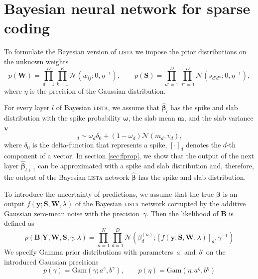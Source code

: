 \documentclass{article}
\begin{document}
\section{Bayesian neural network for sparse coding}
\label{sec:bayesian_lista}
To formulate the Bayesian version of \textsc{lista} we impose the prior distributions on the unknown weights
\begin{equation}
\label{eq:ws}
p(\mathbf{W}) = \prod_{d=1}^D\prod_{k=1}^K \mathcal{N}(w_{ij} ; 0, \eta^{-1}), \qquad
p(\mathbf{S}) = \prod_{d'=1}^D\prod_{d''=1}^D \mathcal{N}(s_{d'd''} ; 0, \eta^{-1}),
\end{equation}
where $\eta$ is the precision of the Gaussian distribution.

For every layer $l$ of Bayesian \textsc{lista}, we assume that $\widehat{\boldsymbol\beta}_{l}$ has the spike and slab distribution with the spike probability $\boldsymbol\omega$, the slab mean $\mathbf{m}$, and the slab variance $\mathbf{v}$
\begin{equation}
[\widehat{\boldsymbol\beta}_{l}]_d \sim \omega_d \delta_0 + (1 - \omega_d)\mathcal{N}(m_d, v_d),
\end{equation}
where $\delta_0$ is the delta-function that represents a spike, $[\cdot]_d$ denotes the $d$-th component of a vector. In section \ref{sec:fprop}, we show that the output of the next layer $\widehat{\boldsymbol\beta}_{l+1}$ can be approximated with a spike and slab distribution and, therefore, the output of the Bayesian \textsc{lista} network $\widehat{\boldsymbol\beta}$ has the spike and slab distribution.

To introduce the uncertainty of predictions, we assume that the true $\boldsymbol\beta$ is an output $f(\mathbf{y} ; \mathbf{S}, \mathbf{W}, \lambda)$ of the Bayesian \textsc{lista} network corrupted by the additive Gaussian zero-mean noise with the precision~$\gamma$. Then the likelihood of $\mathbf{B}$ is defined as
\begin{equation}
\label{eq:likelihood}
p(\mathbf{B}| \mathbf{Y}, \mathbf{W}, \mathbf{S}, \gamma, \lambda) = \prod_{n=1}^N\prod_{d=1}^D\mathcal{N}\left(\beta_d^{(n)}; [f(\mathbf{y} ; \mathbf{S}, \mathbf{W}, \lambda)]_d, \gamma^{-1}\right)
\end{equation}
We specify Gamma prior distributions with parameters~$a^{\cdot}$ and~$b^{\cdot}$ on the introduced Gaussian precisions
\begin{equation}
\label{eq:gamma_eta}
p(\gamma) = \text{Gam}\left(\gamma; a^{\gamma}, b^{\gamma}\right), \qquad
p(\eta) = \text{Gam}\left(\eta; 	a^{\eta}, b^{\eta}\right)
\end{equation}
\end{document}
